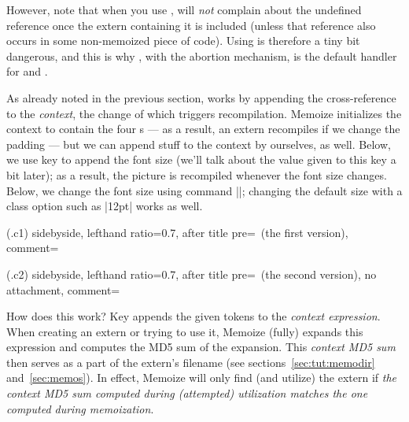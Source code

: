 \documentclass[a4paper,11pt]{article}
\begin{document}
However, note that when you use ,  will
\emph{not} complain about the undefined reference once the extern containing it
is included (unless that reference also occurs in some non-memoized piece of
code).  Using  is therefore a tiny bit dangerous, and
this is why , with the abortion mechanism, is the default
handler for  and .

As already noted in the previous section,  works by appending the
cross-reference to the \emph{context}, the change of which triggers
recompilation.  Memoize initializes the context to contain the four
s --- as a result, an extern recompiles if we change the
padding --- but we can append stuff to the context by ourselves, as well.
Below, we use key  to append the font size (we'll talk
about the value given to this key a bit later); as a result, the picture is
recompiled whenever the font size changes.  Below, we change the font size
using command |\small|; changing the default size with a class option such as
|12pt| works as well.

(.c1){
  sidebyside, lefthand ratio=0.7, after title pre={\ (the first version)},
  comment={
  }
}

(.c2){
  sidebyside, lefthand ratio=0.7, after title pre={\ (the second version)},
  no attachment,
  comment={
  }
}

How does this work? Key  appends the given tokens to the
\emph{context expression}.  When creating an extern or trying to use it,
Memoize (fully) expands this expression and computes the MD5 sum of the
expansion.  This \emph{context MD5 sum} then serves as a part of the extern's
filename (see sections~\ref{sec:tut:memodir} and~\ref{sec:memos}).  In effect,
Memoize will only find (and utilize) the extern if \emph{the context MD5 sum
  computed during (attempted) utilization matches the one computed during
  memoization}.  
\end{document}
